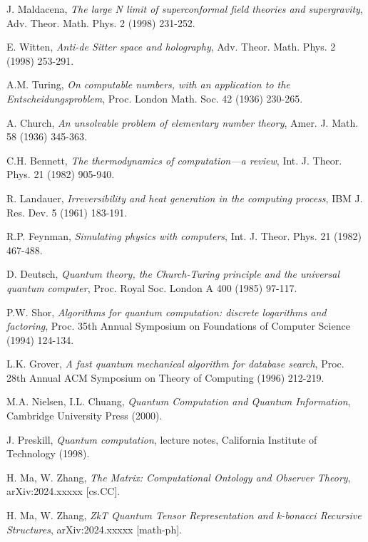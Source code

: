 \documentclass[11pt]{article}
\begin{document}
\begin{thebibliography}{99}
 J. Maldacena, \textit{The large N limit of superconformal field theories and supergravity}, Adv. Theor. Math. Phys. 2 (1998) 231-252.

 E. Witten, \textit{Anti-de Sitter space and holography}, Adv. Theor. Math. Phys. 2 (1998) 253-291.

 A.M. Turing, \textit{On computable numbers, with an application to the Entscheidungsproblem}, Proc. London Math. Soc. 42 (1936) 230-265.

 A. Church, \textit{An unsolvable problem of elementary number theory}, Amer. J. Math. 58 (1936) 345-363.

 C.H. Bennett, \textit{The thermodynamics of computation—a review}, Int. J. Theor. Phys. 21 (1982) 905-940.

 R. Landauer, \textit{Irreversibility and heat generation in the computing process}, IBM J. Res. Dev. 5 (1961) 183-191.

 R.P. Feynman, \textit{Simulating physics with computers}, Int. J. Theor. Phys. 21 (1982) 467-488.

 D. Deutsch, \textit{Quantum theory, the Church-Turing principle and the universal quantum computer}, Proc. Royal Soc. London A 400 (1985) 97-117.

 P.W. Shor, \textit{Algorithms for quantum computation: discrete logarithms and factoring}, Proc. 35th Annual Symposium on Foundations of Computer Science (1994) 124-134.

 L.K. Grover, \textit{A fast quantum mechanical algorithm for database search}, Proc. 28th Annual ACM Symposium on Theory of Computing (1996) 212-219.

 M.A. Nielsen, I.L. Chuang, \textit{Quantum Computation and Quantum Information}, Cambridge University Press (2000).

 J. Preskill, \textit{Quantum computation}, lecture notes, California Institute of Technology (1998).

 H. Ma, W. Zhang, \textit{The Matrix: Computational Ontology and Observer Theory}, arXiv:2024.xxxxx [cs.CC].

 H. Ma, W. Zhang, \textit{ZkT Quantum Tensor Representation and k-bonacci Recursive Structures}, arXiv:2024.xxxxx [math-ph].

\end{thebibliography}
\end{document}
